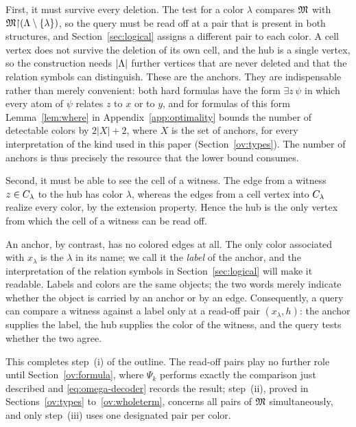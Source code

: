 First, it must survive every deletion. The test for a color $\lambda$
compares $\mathfrak M$ with $\mathfrak M\mathord{\restriction}(\Lambda\setminus\{\lambda\})$, so the query must be
read off at a pair that is present in both structures, and
Section~\ref{sec:logical} assigns a different pair to each color. A cell
vertex does not survive the deletion of its own cell, and the hub is a
single vertex, so the construction needs $|\Lambda|$ further vertices that are
never deleted and that the relation symbols can distinguish. These are the
anchors. They are indispensable rather than merely convenient: both hard
formulas have the form $\exists z\,\psi$ in which every atom of $\psi$
relates $z$ to $x$ or to $y$, and for formulas of this form
Lemma~\ref{lem:where} in Appendix~\ref{app:optimality} bounds the number
of detectable colors by $2|X|+2$, where $X$ is the set of anchors, for every
interpretation of the kind used in this paper (Section~\ref{ov:types}). The number of anchors is thus
precisely the resource that the lower bound consumes.

Second, it must be able to see the cell of a witness. The edge from a
witness $z\in C_{\lambda}$ to the hub has color $\lambda$, whereas the edges
from a cell vertex into $C_{\lambda}$ realize every color, by the extension
property. Hence the hub is the only vertex from which the cell of a witness
can be read off.

An anchor, by contrast, has no colored edges at all. The only color
associated with $x_\lambda$ is the $\lambda$ in its name; we call it the
\emph{label} of the anchor, and the interpretation of the relation symbols
in Section~\ref{sec:logical} will make it readable. Labels and colors are
the same objects; the two words merely indicate whether the object is
carried by an anchor or by an edge. Consequently, a query can compare a
witness against a label only at a read-off pair $(x_\lambda,h)$: the anchor
supplies the label, the hub supplies the color of the witness, and the query
tests whether the two agree.

This completes step~(i) of the outline. The read-off pairs play no further
role until Section~\ref{ov:formula}, where $\Psi_k$ performs exactly the
comparison just described and \eqref{eq:omega-decoder} records the result;
step~(ii), proved in Sections~\ref{ov:types} to~\ref{ov:wholeterm},
concerns all pairs of $\mathfrak M$ simultaneously, and only step~(iii) uses one
designated pair per color.

